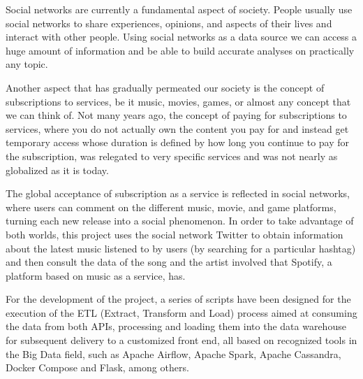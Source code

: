 

\nonzeroparskip Social networks are currently a fundamental aspect of society. People usually use social networks to share experiences, opinions, and aspects of their lives and interact with other people. Using social networks as a data source we can access a huge amount of information and be able to build accurate analyses on practically any topic.

\nonzeroparskip Another aspect that has gradually permeated our society is the concept of subscriptions to services, be it music, movies, games, or almost any concept that we can think of. Not many years ago, the concept of paying for subscriptions to services, where you do not actually own the content you pay for and instead get temporary access whose duration is defined by how long you continue to pay for the subscription, was relegated to very specific services and was not nearly as globalized as it is today.

\nonzeroparskip The global acceptance of subscription as a service is reflected in social networks, where users can comment on the different music, movie, and game platforms, turning each new release into a social phenomenon. In order to take advantage of both worlds, this project uses the social network Twitter to obtain information about the latest music listened to by users (by searching for a particular hashtag) and then consult the data of the song and the artist involved that Spotify, a platform based on music as a service, has.

\nonzeroparskip For the development of the project, a series of scripts have been designed for the execution of the ETL (Extract, Transform and Load) process aimed at consuming the data from both APIs, processing and loading them into the data warehouse for subsequent delivery to a customized front end, all based on recognized tools in the Big Data field, such as Apache Airflow, Apache Spark, Apache Cassandra, Docker Compose and Flask, among others.